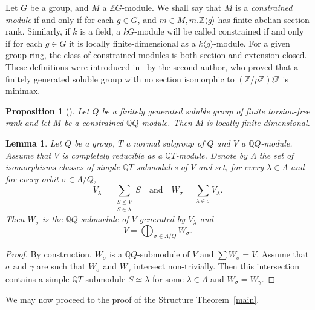 \documentclass[11pt]{article}
\newtheorem{lemm}[theo]{Lemma}
\newtheorem{prop}[theo]{Proposition}
\theoremstyle{definition}
\numberwithin{equation}{section}
\numberwithin{figure}{section}
\numberwithin{table}{section}
\newcommand{\Q}{\mathbb{Q}}
\newcommand{\Z}{\mathbb{Z}}
\begin{document}
Let $G$ be a group, and $M$ a $\Z G$-module. We shall say that $M$ is a \emph{constrained module} if and only if for each $g \in G$, and $m \in M, m.\Z\langle g\rangle$ has finite abelian section rank. Similarly, if $k$ is a field, a $kG$-module will be called constrained if and only if for each $g \in G$ it is locally finite-dimensional as a $k\langle g\rangle$-module. For a given group ring, the class of constrained modules is both section and extension closed. These definitions were introduced in~\cite{K84} by the second author, who proved that a finitely generated soluble group with no section isomorphic to $(\Z/p\Z) \wr \Z$ is minimax.

\begin{prop}[{\cite[Lemma~3.3]{K2}}]\label{1985}
Let $Q$ be a finitely generated soluble group of finite torsion-free rank and let $M$ be a constrained $\Q Q$-module. Then $M$ is locally finite dimensional.
\end{prop}


\begin{lemm}\label{lem-direct sum}
Let $Q$ be a group, $T$ a normal subgroup of $Q$ and $V$ a $\Q Q$-module. Assume that $V$ is completely reducible as a $\Q T$-module. Denote by $\Lambda$ the set of isomorphisms classes of simple $\Q T$-submodules of $V$ and set, for every $\lambda \in \Lambda$ and for every orbit $\sigma \in \Lambda/Q$,
\[
V_\lambda = \sum_{\substack{S \leqslant V \\ S\in\lambda}} S \quad\text{and}\quad W_\sigma = \sum_{\lambda \in \sigma} V_\lambda.
\]
Then $W_\sigma$ is the $\Q Q$-submodule of $V$ generated by $V_\lambda$ and
\[
V = \bigoplus_{\sigma \in \Lambda/Q} W_\sigma.
\]
\end{lemm}


\begin{proof}
By construction, $W_\sigma$ is a $\Q Q$-submodule of $V$ and $\sum W_\sigma = V$. Assume that $\sigma $ and $\gamma$ are such that $W_\sigma$ and $W_\gamma$ intersect non-trivially. Then this intersection contains a simple $\Q T$-submodule $S \simeq \lambda$ for some $\lambda \in \Lambda$ and $W_\sigma = W_\gamma$.
\end{proof}


We may now proceed to the proof of the Structure Theorem~\ref{main}.
\end{document}
